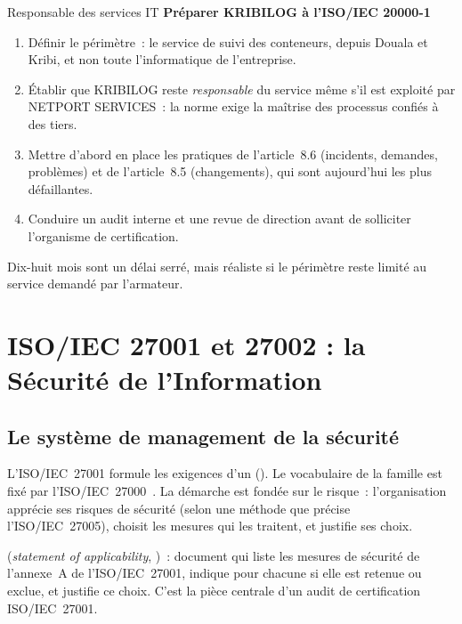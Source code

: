 \begin{boxmetier}{Responsable des services IT}
\textbf{Préparer KRIBILOG à l'ISO/IEC 20000-1}
\begin{enumerate}
    \item Définir le périmètre~: le service de suivi des conteneurs, depuis
          Douala et Kribi, et non toute l'informatique de l'entreprise.
    \item Établir que KRIBILOG reste \emph{responsable} du service même s'il
          est exploité par NETPORT SERVICES~: la norme exige la maîtrise
          des processus confiés à des tiers.
    \item Mettre d'abord en place les pratiques de l'article~8.6
          (incidents, demandes, problèmes) et de l'article~8.5
          (changements), qui sont aujourd'hui les plus défaillantes.
    \item Conduire un audit interne et une revue de direction avant de
          solliciter l'organisme de certification.
\end{enumerate}
Dix-huit mois sont un délai serré, mais réaliste si le périmètre reste
limité au service demandé par l'armateur.
\end{boxmetier}

\section{ISO/IEC 27001 et 27002 : la Sécurité de l'Information}
\label{sec:c09-27001}

\subsection{Le système de management de la sécurité}

L'ISO/IEC~27001 formule les exigences d'un  (). Le vocabulaire de la famille
est fixé par l'ISO/IEC~27000~\cite{iso27000_2018}. La démarche est fondée
sur le risque~: l'organisation apprécie ses risques de sécurité (selon une
méthode que précise l'ISO/IEC~27005), choisit les mesures qui les
traitent, et justifie ses choix.

\begin{boxdef}
(\textit{statement of applicability}, )~: document qui liste les
mesures de sécurité de l'annexe~A de l'ISO/IEC~27001, indique pour
chacune si elle est retenue ou exclue, et justifie ce choix. C'est la
pièce centrale d'un audit de certification ISO/IEC~27001.
\end{boxdef}

